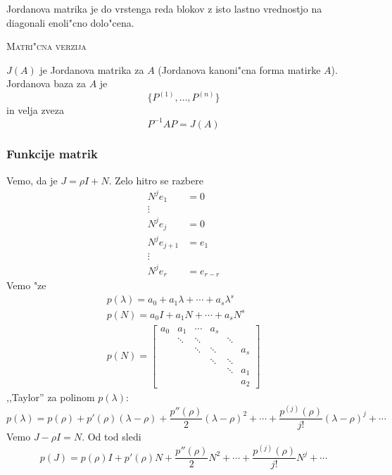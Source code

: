 Jordanova matrika je do vrstenga reda blokov z isto lastno vrednostjo na diagonali enoli"cno dolo"cena.

\textsc{Matri"cna verzija}

$J(A)$ je Jordanova matrika za $A$ (Jordanova kanoni"cna forma matirke $A$). Jordanova baza za $A$ je
\begin{equation*}
\{P^{(1)}, \ldots, P^{(n)}\}
\end{equation*}
in velja zveza
\begin{equation*}
P^{-1}AP = J(A)
\end{equation*}

\subsubsection{Funkcije matrik}
Vemo, da je $J = \rho I + N$. Zelo hitro se razbere
\begin{align*}
N^j e_1 &= 0 \\
\vdots \\
N^j e_j &= 0 \\
N^j e_{j + 1} &= e_1 \\
\vdots \\
N^j e_r &= e_{r-r}
\end{align*}
Vemo "ze
\begin{gather*}
p(\lambda) = a_0 + a_1 \lambda + \cdots + a_s \lambda^s \\
p(N) = a_0 I + a_1 N + \cdots + a_s N^s \\
p(N) = \begin{bmatrix}
a_0 & a_1 & \cdots & a_s & & \\
& \ddots & \ddots & & \ddots & \\
& & \ddots & \ddots & &  a_s \\
&&& \ddots & \ddots & \\
&&&& \ddots & a_1 \\
&&&&& a_2
\end{bmatrix}
\end{gather*}
,,Taylor'' za polinom $p(\lambda)$:
\begin{equation*}
p(\lambda) = p(\rho) + p'(\rho)(\lambda - \rho) + \dfrac{p''(\rho)}{2} (\lambda - \rho)^2 + \cdots + \dfrac{p^{(j)}(\rho)}{j!} (\lambda - \rho)^j + \cdots
\end{equation*}
Vemo $J - \rho I = N$. Od tod sledi
\begin{equation*}
p(J) = p(\rho)I + p'(\rho) N + \dfrac{p''(\rho)}{2} N^2 + \cdots + \dfrac{p^{(j)}(\rho)}{j!} N^j + \cdots
\end{equation*}

